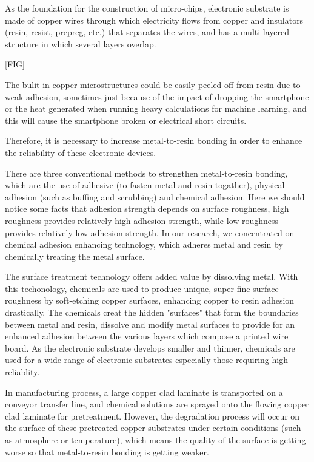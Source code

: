 \documentclass[10pt,twocolumn,letterpaper]{article}
\begin{document}
As the foundation for the construction of micro-chips, electronic substrate is made of copper wires through which electricity flows from copper and insulators (resin, resist, prepreg, etc.) that separates the wires, and has a multi-layered structure in which several layers overlap.

[FIG]

The bulit-in copper microstructures could be easily peeled off from resin due to weak adhesion, sometimes just because of the impact of dropping the smartphone or the heat generated when running heavy calculations for machine learning, and this will cause the smartphone broken or electrical short circuits.

Therefore, it is necessary to increase metal-to-resin bonding in order to enhance the reliability of these electronic devices.

There are three conventional methods to strengthen metal-to-resin bonding, which are the use of adhesive (to fasten metal and resin togather), physical adhesion (such as buffing and scrubbing) and chemical adhesion.
Here we should notice some facts that adhesion strength depends on surface roughness, high roughness provides relatively high adhesion strength, while low roughness provides relatively low adhesion strength.
In our research, we concentrated on chemical adhesion enhancing technology, which adheres metal and resin by chemically treating the metal surface.

The surface treatment technology offers added value by dissolving metal.
With this techonology, chemicals are used to produce unique, super-fine surface roughness by soft-etching copper surfaces, enhancing copper to resin adhesion drastically.
The chemicals creat the hidden "surfaces" that form the boundaries between metal and resin, dissolve and modify metal surfaces to provide for an enhanced adhesion between the various layers which compose a printed wire board. 
As the electronic substrate develops smaller and thinner, chemicals are used for a wide range of electronic substrates especially those requiring high reliablity. 

In manufacturing process, a large copper clad laminate is transported on a conveyor transfer line, and chemical solutions are sprayed onto the flowing copper clad laminate for pretreatment.
However, the degradation process will occur on the surface of these pretreated copper substrates under certain conditions (such as atmosphere or temperature), which means the quality of the surface is getting worse so that metal-to-resin bonding is getting weaker.
\end{document}
